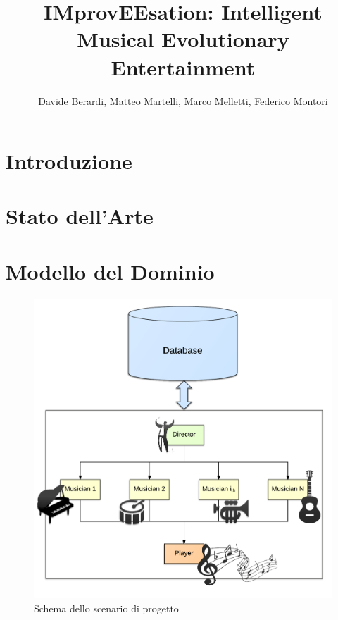 \documentclass[a4paper,10pt]{article}
\title{IMprovEEsation: Intelligent Musical Evolutionary Entertainment}
\author{Davide Berardi, Matteo Martelli, Marco Melletti, Federico Montori}
\begin{document}
\maketitle

\begin{abstract}

\end{abstract}

\section{Introduzione}

\section{Stato dell'Arte}

\section{Modello del Dominio}
\begin{figure}[H]
\centering
\includegraphics[scale=0.30]{model.png}
\caption{Schema dello scenario di progetto}
\end{figure}
\end{document}

